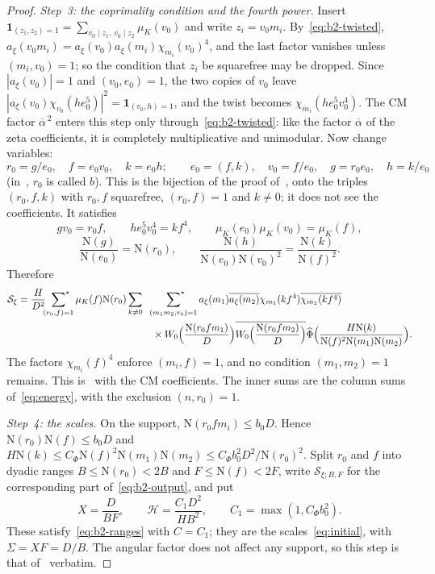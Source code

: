 \documentclass[11pt]{article}
\numberwithin{equation}{section}
\newcommand{\N}{\mathrm N}
\newcommand{\muk}{\mu_K}
\newcommand{\ind}{\mathbf1}
\newcommand{\ssum}{\sideset{}{^*}\sum}
\begin{document}
\begin{proof}
\emph{Step~3: the coprimality condition and the fourth power.} Insert
$\ind_{(z_1,z_2)=1}=\sum_{v_0\mid z_1,\,v_0\mid z_2}\muk(v_0)$ and write $z_i=v_0m_i$.
By~\eqref{eq:b2-twisted}, $a_\xi(v_0m_i)=a_\xi(v_0)a_\xi(m_i)\chi_{m_i}(v_0)^4$, and the
last factor vanishes unless $(m_i,v_0)=1$; so the condition that $z_i$ be squarefree may be
dropped. Since $|a_\xi(v_0)|=1$ and $(v_0,e_0)=1$, the two copies of $v_0$ leave
$|a_\xi(v_0)\chi_{v_0}(he_0^5)|^2=\ind_{(v_0,h)=1}$, and the twist becomes
$\chi_{m_i}(he_0^5v_0^4)$. The CM factor $\overline\alpha^{\,2}$ enters this step only
through~\eqref{eq:b2-twisted}: like the factor $\overline\alpha$ of the zeta coefficients,
it is completely multiplicative and unimodular. Now change variables:
\begin{equation}\label{eq:d048}
 r_0=g/e_0,\quad f=e_0v_0,\quad k=e_0h;\qquad
 e_0=(f,k),\quad v_0=f/e_0,\quad g=r_0e_0,\quad h=k/e_0
\end{equation}
(in~\cite{OAI1112}, $r_0$ is called $b$). This is the bijection of the proof
of~\cite[Proposition~4.5]{OAI1112}, onto the triples $(r_0,f,k)$ with $r_0,f$ squarefree,
$(r_0,f)=1$ and $k\ne0$; it does not see the coefficients. It satisfies
\begin{equation}\label{eq:d049}
 gv_0=r_0f,\qquad he_0^5v_0^4=kf^4,\qquad \muk(e_0)\muk(v_0)=\muk(f),
\end{equation}
\begin{equation}\label{eq:d050}
 \frac{\N(g)}{\N(e_0)}=\N(r_0),\qquad \frac{\N(h)}{\N(e_0)\N(v_0)^2}=\frac{\N(k)}{\N(f)^2}.
\end{equation}
Therefore
\begin{equation}\label{eq:b2-output}
\begin{split}
 \mathcal S_\xi=\frac H{D^2}\ssum_{(r_0,f)=1}\muk(f)\N(r_0)\sum_{k\ne0}\quad
 &\ssum_{(m_1m_2,r_0)=1}a_\xi(m_1)\overline{a_\xi(m_2)}
  \chi_{m_1}(kf^4)\overline{\chi_{m_2}(kf^4)}\\
 &\times W_0\Bigl(\frac{\N(r_0fm_1)}D\Bigr)\overline{W_0\Bigl(\frac{\N(r_0fm_2)}D\Bigr)}
 \widehat\Phi\Bigl(\frac{H\N(k)}{\N(f)^2\N(m_1)\N(m_2)}\Bigr).
\end{split}
\end{equation}
The factors $\chi_{m_i}(f)^4$ enforce $(m_i,f)=1$, and no condition $(m_1,m_2)=1$ remains.
This is~\cite[(4.16)]{OAI1112} with the CM coefficients. The inner sums are the column sums
of~\eqref{eq:energy}, with the exclusion $(n,r_0)=1$.

\emph{Step~4: the scales.} On the support, $\N(r_0fm_i)\le b_0D$. Hence
$\N(r_0)\N(f)\le b_0D$ and
$H\N(k)\le C_\Phi\N(f)^2\N(m_1)\N(m_2)\le C_\Phi b_0^2D^2/\N(r_0)^2$. Split $r_0$ and $f$
into dyadic ranges $B\le\N(r_0)<2B$ and $F\le\N(f)<2F$, write $\mathcal S_{\xi;B,F}$ for the
corresponding part of~\eqref{eq:b2-output}, and put
\begin{equation}\label{eq:d051}
 X=\frac D{BF},\qquad \mathcal H=\frac{C_1D^2}{HB^2},\qquad C_1=\max(1,C_\Phi b_0^2).
\end{equation}
These satisfy~\eqref{eq:b2-ranges} with $C=C_1$; they are the scales~\eqref{eq:initial},
with $\Sigma=XF=D/B$. The angular factor does not affect any support, so this step is that
of~\cite[proof of Proposition~4.5]{OAI1112} verbatim.


\end{proof}
\end{document}
